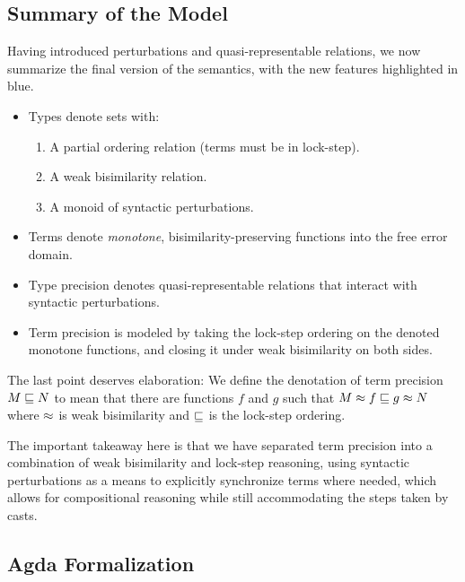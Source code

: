 \documentclass{article}
\theoremstyle{definition}
\theoremstyle{remark}
\begin{document}
\subsection{Summary of the Model}

Having introduced perturbations and quasi-representable relations, we now
summarize the final version of the semantics, with the new features
{\color{blue}highlighted in blue}.

\begin{itemize}
  \item Types denote sets with:
  \begin{enumerate}
    \item A partial ordering relation (terms must be in lock-step).
    \item {\color{blue} A weak bisimilarity relation.}
    \item {\color{blue} A monoid of syntactic perturbations.}
  \end{enumerate}
  \item Terms denote \emph{monotone}, {\color{blue}bisimilarity-preserving}
  functions into the free error domain.
  \item Type precision denotes {\color{blue}quasi-}representable relations that
  {\color{blue}interact with syntactic perturbations}.
  \item Term precision is modeled by {\color{blue}taking the lock-step ordering
  on the denoted monotone functions, and closing it under weak bisimilarity on
  both sides.}
\end{itemize}

The last point deserves elaboration: We define the denotation of term precision
$M \sqsubseteq N$ to mean that there are functions $f$ and $g$ such that $M \approx f
\sqsubseteq g \approx N$ where $\approx$ is weak bisimilarity and $\sqsubseteq$ is the
lock-step ordering.

The important takeaway here is that we have separated term precision into a
combination of weak bisimilarity and lock-step reasoning, using syntactic
perturbations as a means to explicitly synchronize terms where needed, which
allows for compositional reasoning while still accommodating the steps taken by
casts.



\subsection{Agda Formalization}
\end{document}
